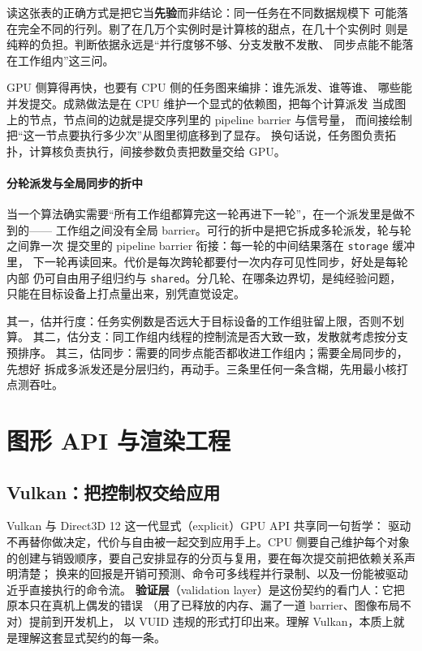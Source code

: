 \documentclass[12pt,a4paper,fontset=fandol]{ctexbook}
\newcommand{\Tp}[1]{\texttt{#1}}
\newcommand{\Lang}[1]{\textsf{#1}}
\newcommand{\DomCPU}{\Lang{CPU}}
\newcommand{\DomGPU}{\Lang{GPU}}
\begin{document}
读这张表的正确方式是把它当\textbf{先验}而非结论：同一任务在不同数据规模下
可能落在完全不同的行列。剔了在几万个实例时是计算核的甜点，在几十个实例时
则是纯粹的负担。判断依据永远是``并行度够不够、分支发散不发散、
同步点能不能落在工作组内''这三问。

\DomGPU{} 侧算得再快，也要有 \DomCPU{} 侧的任务图来编排：谁先派发、谁等谁、
哪些能并发提交。成熟做法是在 \DomCPU{} 维护一个显式的依赖图，把每个计算派发
当成图上的节点，节点间的边就是提交序列里的 pipeline barrier 与信号量，
而间接绘制把``这一节点要执行多少次''从图里彻底移到了显存。
换句话说，任务图负责拓扑，计算核负责执行，间接参数负责把数量交给 \DomGPU{}。

\subsection{分轮派发与全局同步的折中}

当一个算法确实需要``所有工作组都算完这一轮再进下一轮''，在一个派发里是做不到的——
工作组之间没有全局 barrier。可行的折中是把它拆成多轮派发，轮与轮之间靠一次
提交里的 pipeline barrier 衔接：每一轮的中间结果落在 \Tp{storage} 缓冲里，
下一轮再读回来。代价是每次跨轮都要付一次内存可见性同步，好处是每轮内部
仍可自由用子组归约与 \Tp{shared}。分几轮、在哪条边界切，是纯经验问题，
只能在目标设备上打点量出来，别凭直觉设定。

\begin{bestpractice}[title={把计算搬下 \DomGPU{} 前的三条自检}]
其一，估并行度：任务实例数是否远大于目标设备的工作组驻留上限，否则不划算。
其二，估分支：同工作组内线程的控制流是否大致一致，发散就考虑按分支预排序。
其三，估同步：需要的同步点能否都收进工作组内；需要全局同步的，先想好
拆成多派发还是分层归约，再动手。三条里任何一条含糊，先用最小核打点测吞吐。
\end{bestpractice}

\part{图形 API 与渲染工程}
\chapter{Vulkan：把控制权交给应用}
\label{ch:ch09-vulkan}

Vulkan 与 \Lang{Direct3D 12} 这一代显式（explicit）\DomGPU{} API 共享同一句哲学：
驱动不再替你做决定，代价与自由被一起交到应用手上。\DomCPU{} 侧要自己维护每个对象
的创建与销毁顺序，要自己安排显存的分页与复用，要在每次提交前把依赖关系声明清楚；
换来的回报是开销可预测、命令可多线程并行录制、以及一份能被驱动近乎直接执行的命令流。
\textbf{验证层}（validation layer）是这份契约的看门人：它把原本只在真机上偶发的错误
（用了已释放的内存、漏了一道 barrier、图像布局不对）提前到开发机上，
以 VUID 违规的形式打印出来。理解 Vulkan，本质上就是理解这套显式契约的每一条。
\end{document}
